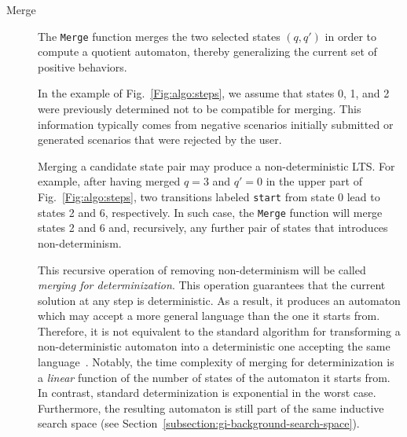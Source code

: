 \begin{description}
\item[Merge] The \texttt{Merge} function merges the two selected states $(q, q')$ in order to compute a quotient automaton, thereby generalizing the current set of positive behaviors. 

In the example of Fig.~\ref{Fig:algo:steps}, we assume that states 0, 1, and 2 were previously determined not to be compatible for merging. This information typically comes from negative scenarios initially submitted or generated scenarios that were rejected by the user. 

Merging a candidate state pair may produce a non-deterministic LTS. For example, after having merged $q = 3$ and $q' = 0$ in the upper part of Fig.~\ref{Fig:algo:steps}, two transitions labeled \texttt{start} from state 0 lead to states 2 and 6, respectively. In such case, the \texttt{Merge} function will merge states 2 and 6 and, recursively, any further pair of states that introduces non-determinism. 

This recursive operation of removing non-determinism will be called \textsl{merging for determinization}. This operation guarantees that the current solution at any step is deterministic. As a result, it produces an automaton which may accept a more general language than the one it starts from. Therefore, it is not equivalent to the standard algorithm for transforming a non-deterministic automaton into a deterministic one accepting the same language~\cite{Hopcroft:1979}. Notably, the time complexity of merging for determinization is a \emph{linear} function of the number of states of the automaton it starts from. In contrast, standard determinization is exponential in the worst case. Furthermore, the resulting automaton is still part of the same inductive search space (see Section~\ref{subsection:gi-background-search-space}). 


\end{description}
